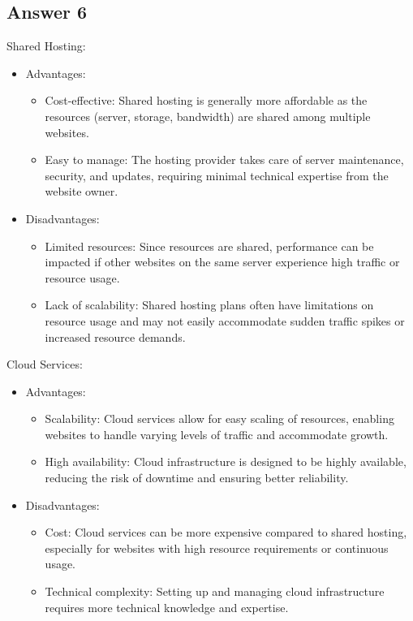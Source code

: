 \documentclass{article}
\begin{document}
\subsection*{Answer 6}
Shared Hosting:
\begin{itemize}
  \item Advantages:
  \begin{itemize}
    \item Cost-effective: Shared hosting is generally more affordable as the resources (server, storage, bandwidth) are shared among multiple websites.
    \item Easy to manage: The hosting provider takes care of server maintenance, security, and updates, requiring minimal technical expertise from the website owner.
  \end{itemize}
  \item Disadvantages:
  \begin{itemize}
    \item Limited resources: Since resources are shared, performance can be impacted if other websites on the same server experience high traffic or resource usage.
    \item Lack of scalability: Shared hosting plans often have limitations on resource usage and may not easily accommodate sudden traffic spikes or increased resource demands.
  \end{itemize}
\end{itemize}

Cloud Services:
\begin{itemize}
  \item Advantages:
  \begin{itemize}
    \item Scalability: Cloud services allow for easy scaling of resources, enabling websites to handle varying levels of traffic and accommodate growth.
    \item High availability: Cloud infrastructure is designed to be highly available, reducing the risk of downtime and ensuring better reliability.
  \end{itemize}
  \item Disadvantages:
  \begin{itemize}
    \item Cost: Cloud services can be more expensive compared to shared hosting, especially for websites with high resource requirements or continuous usage.
    \item Technical complexity: Setting up and managing cloud infrastructure requires more technical knowledge and expertise.
  \end{itemize}
\end{itemize}
\end{document}
